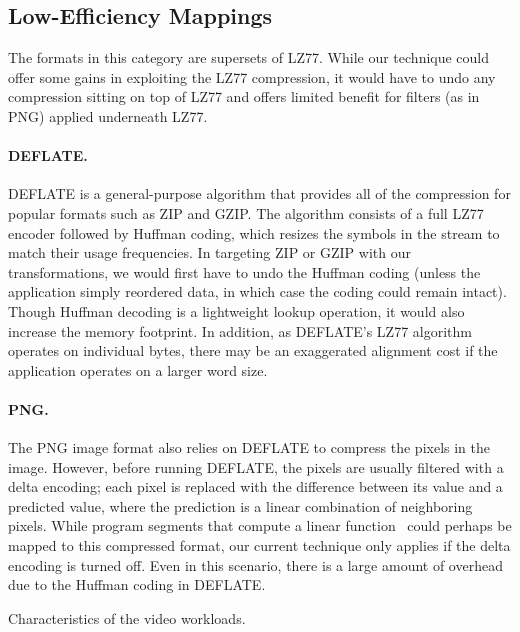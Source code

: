 \subsection{Low-Efficiency Mappings}
\label{sec:formats-bad}

The formats in this category are supersets of LZ77.  While our
technique could offer some gains in exploiting the LZ77 compression,
it would have to undo any compression sitting on top of LZ77 and
offers limited benefit for filters (as in PNG) applied underneath
LZ77.

\paragraph{DEFLATE.}
DEFLATE is a general-purpose algorithm that provides all of the
compression for popular formats such as ZIP and GZIP.  The algorithm
consists of a full LZ77 encoder followed by Huffman coding, which
resizes the symbols in the stream to match their usage frequencies.
In targeting ZIP or GZIP with our transformations, we would first
have to undo the Huffman coding (unless the application simply
reordered data, in which case the coding could remain intact).  Though
Huffman decoding is a lightweight lookup operation, it would also
increase the memory footprint.  In addition, as DEFLATE's LZ77
algorithm operates on individual bytes, there may be an exaggerated
alignment cost if the application operates on a larger word size.


\paragraph{PNG.}
The PNG image format also relies on DEFLATE to compress the pixels in
the image.  However, before running DEFLATE, the pixels are usually
filtered with a delta encoding; each pixel is replaced with the
difference between its value and a predicted value, where the
prediction is a linear combination of neighboring pixels.  While
program segments that compute a linear function~\cite{aalamb} could
perhaps be mapped to this compressed format, our current technique
only applies if the delta encoding is turned off.  Even in this
scenario, there is a large amount of overhead due to the Huffman
coding in DEFLATE.

\begin{table*}[t]
\vspace{-1\baselineskip}
\caption{Characteristics of the video workloads.
\protect\label{tab:videos}}
\end{table*}
